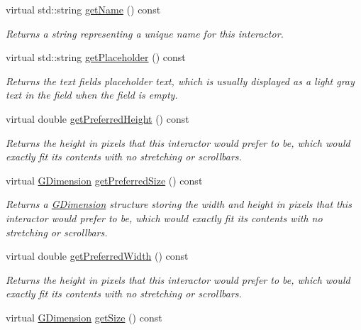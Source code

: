 \begin{DoxyCompactItemize}
virtual std\+::string \mbox{\hyperlink{classsgl_1_1GInteractor_a8a60438a5b55d0b2ceb35c8674b9d8c5}{get\+Name}} () const
\begin{DoxyCompactList}\small\item\em Returns a string representing a unique name for this interactor. \end{DoxyCompactList}\item 
virtual std\+::string \mbox{\hyperlink{classsgl_1_1GTextField_aa78dbaa7dac1f8cdf9048c91abecc7ad}{get\+Placeholder}} () const
\begin{DoxyCompactList}\small\item\em Returns the text field\textquotesingle{}s placeholder text, which is usually displayed as a light gray text in the field when the field is empty. \end{DoxyCompactList}\item 
virtual double \mbox{\hyperlink{classsgl_1_1GInteractor_a747de0961653847bdc6615dbf756d715}{get\+Preferred\+Height}} () const
\begin{DoxyCompactList}\small\item\em Returns the height in pixels that this interactor would prefer to be, which would exactly fit its contents with no stretching or scrollbars. \end{DoxyCompactList}\item 
virtual \mbox{\hyperlink{structsgl_1_1GDimension}{G\+Dimension}} \mbox{\hyperlink{classsgl_1_1GInteractor_a4aabbee761d8e9116275401131b7ccd1}{get\+Preferred\+Size}} () const
\begin{DoxyCompactList}\small\item\em Returns a \mbox{\hyperlink{structsgl_1_1GDimension}{G\+Dimension}} structure storing the width and height in pixels that this interactor would prefer to be, which would exactly fit its contents with no stretching or scrollbars. \end{DoxyCompactList}\item 
virtual double \mbox{\hyperlink{classsgl_1_1GInteractor_a82bca31d37700fb0e35d2743352efd5e}{get\+Preferred\+Width}} () const
\begin{DoxyCompactList}\small\item\em Returns the height in pixels that this interactor would prefer to be, which would exactly fit its contents with no stretching or scrollbars. \end{DoxyCompactList}\item 
virtual \mbox{\hyperlink{structsgl_1_1GDimension}{G\+Dimension}} \mbox{\hyperlink{classsgl_1_1GInteractor_a7b4eec96a2bdc6420695d5796a78eea9}{get\+Size}} () const

\end{DoxyCompactItemize}
